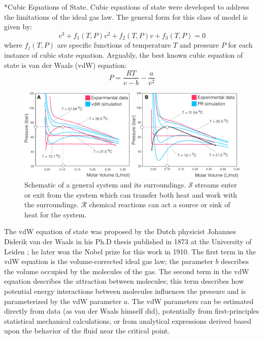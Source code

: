 \documentclass[11pt]{article}
\makeatletter
\theoremstyle{definition}
\renewcommand\subsubsection{\@startsection
	{subsubsection}{2}{0mm}
	{-0.05in}
	{-0.5\baselineskip}
	{\normalfont\normalsize\bfseries}}
\makeatother
\begin{document}
\subsubsection*{Cubic Equations of State.}
Cubic equations of state were developed to address the limitations of the ideal gas law.
The general form for this class of model is given by:
\begin{equation}
v^{3}+f_{1}(T,P)v^2+f_{2}(T,P)v+f_{3}(T,P) = 0
\end{equation}
where $f_{j}(T,P)$ are specific functions of temperature $T$ and pressure $P$ for each instance of cubic state equation.
Arguably, the best known cubic equation of state is van der Waals (vdW) equation:
\begin{equation}
  \displaystyle P = \frac{RT}{v-b} - \frac{a}{v^2}
\end{equation}
\begin{figure}\center
  \includegraphics[width=1.0\textwidth]{./figs/Fig-CubicEOS.pdf}
  \caption{Schematic of a general system and its surroundings.
  $\mathcal{S}$ streams enter or exit from the system which can transfer both heat and work with the surroundings.
  $\mathcal{R}$ chemical reactions can act a source or sink of heat for the system.}\label{fig-energy-schematic}
\end{figure}
The vdW equation of state was proposed by the Dutch physicist Johannes Diderik van der Waals in his Ph.D thesis published in 1873 at the University of Leiden
\cite{vdW-Thesis}; he later won the Nobel prize for this work in 1910.
The first term in the vdW equation is the volume-corrected ideal gas law;
the parameter $b$ describes the volume occupied by the molecules of the gas.
The second term in the vdW equation describes the attraction between molecules; this term describes how potential energy interactions between molecules influences the pressure
and is parameterized by the vdW parameter $a$.
The vdW parameters can be estimated directly from data (as van der Waals himself did), potentially from first-principles statistical mechanical calculations,
or from analytical expressions derived based upon the behavior of the fluid near the critical point.
\end{document}
